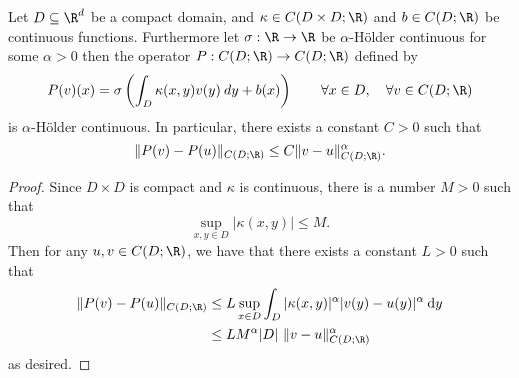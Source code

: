 {\begin{lemma}
\label{lemma:op_continuous}
Let \(D \subseteq \R^d\) be a compact domain, and \(\kappa \in C(D \times D;\R)\) and \(b \in C(D;\R)\)
be continuous functions. Furthermore let \(\sigma: \R \to \R\) be \(\alpha\)-H{\"o}lder continuous for some \(\alpha > 0\)
then the operator \(P: C(D;\R) \to C(D;\R)\) defined by
\[P(v)(x) = \sigma \left ( \int_D \kappa(x,y) v(y) \: dy + b(x) \right ) \qquad \forall x \in D, \quad \forall v \in C(D;\R)\]
is \(\alpha\)-H{\"o}lder continuous. In particular, there exists a constant \(C > 0\) such that
\[\|P(v) - P(u)\|_{C(D;\R)} \leq C \|v - u\|_{C(D;\R)}^\alpha.\]
\end{lemma}
\begin{proof}
Since \(D \times D\) is compact and \(\kappa\) is
continuous, there is a number \(M > 0\) such that
\[\sup_{x,y \in D} |\kappa(x,y)| \leq M .\]
Then for any \(u,v \in C(D;\R)\), we have that there exists a constant \(L > 0\) such that
\begin{align*}
\|P(v) - P(u)\|_{C(D;\R)} &\leq L \sup_{x \in D} \int_D |\kappa(x,y)|^\alpha | v(y) - u(y)|^\alpha \: \text{d}y \\
&\leq L M^\alpha |D|\ \|v - u\|_{C(D;\R)}^\alpha
\end{align*}
as desired.
\end{proof}

}
